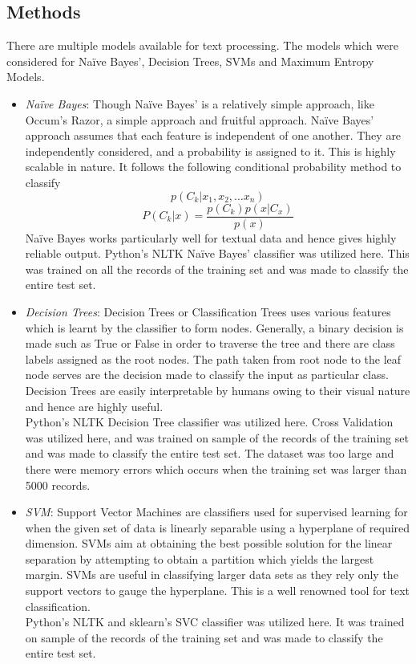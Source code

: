 \documentclass[fleqn,10pt]{SelfArx} %
\begin{document}
\subsection{Methods}
There are multiple models available for text processing. The models which were considered for Naïve Bayes’, Decision Trees, SVMs and Maximum Entropy Models.
\begin{itemize}[noitemsep]
\item \textit{Naïve Bayes}: Though Naïve Bayes’ is a relatively simple approach, like Occum’s Razor, a simple approach and fruitful approach. Naïve Bayes’ approach assumes that each feature is independent of one another. They are independently considered, and a probability is assigned to it. This is highly scalable in nature. It follows the following conditional probability method to classify
$$ p(C_k | x_1,x_2,…x_n) $$
$$P(C_k|x) = \frac{p(C_k)p(x|C_x)}{p(x)}$$
Naïve Bayes works particularly well for textual data and hence gives highly reliable output.
Python’s NLTK Naïve Bayes’ classifier was utilized here. This was trained on all the records of the training set and was made to classify the entire test set.
\item \textit{Decision Trees}: Decision Trees or Classification Trees uses various features which is learnt by the classifier to form nodes. Generally, a binary decision is made such as True or False in order to traverse the tree and there are class labels assigned as the root nodes. The path taken from root node to the leaf node serves are the decision made to classify the input as particular class. Decision Trees are easily interpretable by humans owing to their visual nature and hence are highly useful.\\
Python’s NLTK Decision Tree classifier was utilized here. Cross Validation was utilized here, and was trained on sample of the records of the training set and was made to classify the entire test set. The dataset was too large and there were memory errors which occurs when the training set was larger than 5000 records. 

\item \textit{SVM}: Support Vector Machines are classifiers used for supervised learning for when the given set of data is linearly separable using a hyperplane of required dimension. SVMs aim at obtaining the best possible solution for the linear separation by attempting to obtain a partition which yields the largest margin. SVMs are useful in classifying larger data sets as they rely only the support vectors to gauge the hyperplane. This is a well renowned tool for text classification.\\
Python’s NLTK and sklearn’s SVC classifier was utilized here. It was trained on sample of the records of the training set and was made to classify the entire test set.


\end{itemize}
\end{document}
